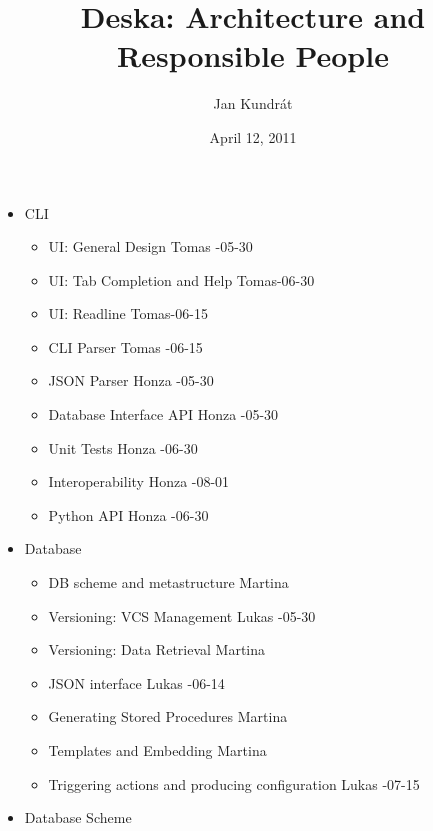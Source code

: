 \documentclass{article}
\begin{document}
\title{Deska: Architecture and Responsible People}

\author{Jan Kundrát}

\date{April 12, 2011}

\maketitle

\TabPositions{12cm,14cm}

\begin{itemize}
    \item CLI
        \begin{itemize}
            \item UI: General Design \tab Tomas -05-30
            \item UI: Tab Completion and Help \tab Tomas-06-30
            \item UI: Readline \tab Tomas-06-15
            \item CLI Parser \tab Tomas -06-15
            \item JSON Parser \tab Honza -05-30
            \item Database Interface API \tab Honza -05-30
            \item Unit Tests \tab Honza -06-30
            \item Interoperability \tab Honza -08-01
            \item Python API \tab Honza -06-30
        \end{itemize}
    \item Database
        \begin{itemize}
            \item DB scheme and metastructure \tab Martina
            \item Versioning: VCS Management \tab Lukas -05-30
            \item Versioning: Data Retrieval \tab Martina
            \item JSON interface \tab Lukas -06-14
            \item Generating Stored Procedures \tab Martina
            \item Templates and Embedding \tab Martina
            \item Triggering actions and producing configuration \tab Lukas -07-15
        \end{itemize}
    \item Database Scheme

\end{itemize}
\end{document}
